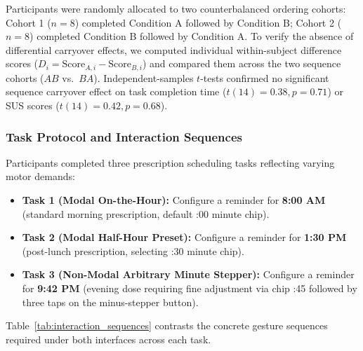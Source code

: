 \documentclass[11pt,a4paper]{article}
\begin{document}
Participants were randomly allocated to two counterbalanced ordering cohorts: Cohort 1 ($n=8$) completed Condition A followed by Condition B; Cohort 2 ($n=8$) completed Condition B followed by Condition A. To verify the absence of differential carryover effects, we computed individual within-subject difference scores ($D_i = \text{Score}_{A,i} - \text{Score}_{B,i}$) and compared them across the two sequence cohorts ($AB$ vs.\ $BA$). Independent-samples $t$-tests confirmed no significant sequence carryover effect on task completion time ($t(14) = 0.38, p = 0.71$) or SUS scores ($t(14) = 0.42, p = 0.68$).

\subsubsection{Task Protocol and Interaction Sequences}
Participants completed three prescription scheduling tasks reflecting varying motor demands:
\begin{itemize}[leftmargin=*]
    \item \textbf{Task 1 (Modal On-the-Hour):} Configure a reminder for \textbf{8:00 AM} (standard morning prescription, default :00 minute chip).
    \item \textbf{Task 2 (Modal Half-Hour Preset):} Configure a reminder for \textbf{1:30 PM} (post-lunch prescription, selecting :30 minute chip).
    \item \textbf{Task 3 (Non-Modal Arbitrary Minute Stepper):} Configure a reminder for \textbf{9:42 PM} (evening dose requiring fine adjustment via chip :45 followed by three taps on the minus-stepper button).
\end{itemize}

Table~\ref{tab:interaction_sequences} contrasts the concrete gesture sequences required under both interfaces across each task.
\end{document}
